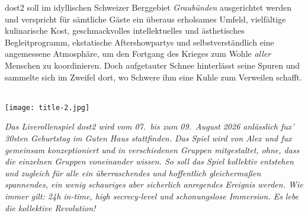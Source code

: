 \ac{dost2} soll im idyllischen Schweizer Berggebiet \emph{Graubünden} ausgerichtet
werden und verspricht für sämtliche Gäste ein überaus erholsames Umfeld,
vielfältige kulinarische Kost, geschmackvolles intellektuelles und
ästhetisches Begleitprogramm, ekstatische Aftershowpartys und
selbstverständlich eine angemessene Atmosphäre, um den Fortgang des Krieges zum
Wohle \emph{aller} Menschen zu koordinieren. Doch aufgetauter Schnee hinterlässt
seine Spuren und sammelte sich im Zweifel dort, wo Schwere ihm eine Kuhle zum
Verweilen schafft.\\\\
%
\begin{minipage}{\textwidth}
  \begin{center}
    \texttt{[image: title-2.jpg]}%
  \end{center}
  \emph{Das Liverollenspiel \ac{dost2} wird vom 07.~bis zum 09.~August 2026
  anlässlich fux' 30sten Geburtstag im Guten Haus stattfinden.
  Das Spiel wird von Alex und fux gemeinsam konzeptioniert und in verschiedenen
  Gruppen mitgestaltet, ohne, dass die einzelnen Gruppen voneinander wissen.
  So soll das Spiel kollektiv entstehen und zugleich für alle ein überraschendes
  und hoffentlich gleichermaßen spannendes, ein wenig schauriges aber sicherlich
  anregendes Ereignis werden.
  Wie immer gilt: 24h in-time, high secrecy-level und schonungslose Immersion.
  Es lebe die kollektive Revolution!}\\
\end{minipage}


